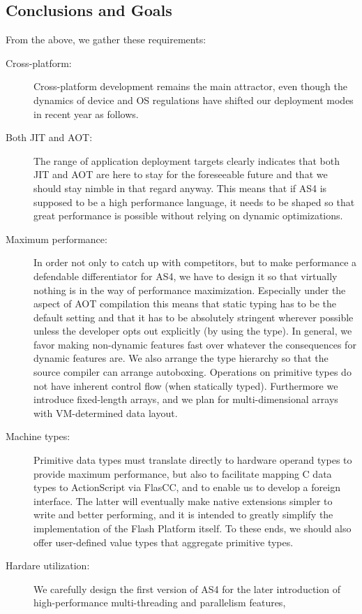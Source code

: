 \subsection{Conclusions and Goals}
From the above, we gather these requirements:
\begin{description}
\item[Cross-platform:] Cross-platform development remains the main attractor,
even though the dynamics of device and OS regulations
have shifted our deployment modes in recent year as follows.
\item [Both JIT and AOT:] The range of application deployment targets clearly
indicates that both JIT and AOT are here to stay for the foreseeable future and
that we should stay nimble in that regard anyway. This means that if
AS4 is supposed to be a high performance language, it needs to be shaped so that
great performance is possible without relying on dynamic optimizations.
\item[Maximum performance:] In order not only to catch up with competitors,
but to make performance a defendable differentiator for AS4, we have to design
it so that virtually nothing is in the way of performance maximization.
Especially under the aspect of AOT compilation this means that static typing
has to be the default setting and that it has to be absolutely stringent
wherever possible unless the
developer opts out explicitly (by using the \code{*} type). In general, we favor making
non-dynamic features fast over whatever the consequences for dynamic features
are. We also arrange the type hierarchy so that the source compiler can arrange
autoboxing. Operations on primitive types do not have inherent control
flow (when statically typed). Furthermore we introduce fixed-length
arrays, and we plan for multi-dimensional arrays with VM-determined
data layout.
\item[Machine types:] Primitive data types must translate directly to hardware
operand types to provide maximum performance, but also to facilitate
mapping C data types to ActionScript via FlasCC, and to enable us to
develop a foreign interface. The latter will eventually make native extensions
simpler to write and better performing, and it is intended to greatly simplify
the implementation of the Flash Platform itself. To these ends, we should also
offer user-defined value types that aggregate primitive types.
\item[Hardare utilization:] We carefully design the first version of AS4
for the later introduction of high-performance multi-threading and parallelism features,

\end{description}
